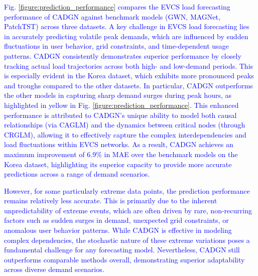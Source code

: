 \documentclass[lettersize,journal]{IEEEtran}
\newcommand{\hl}[1]{\textcolor{blue}{#1}}
\begin{document}
\hl{Fig. \ref{figure:prediction_performance} compares the EVCS load forecasting performance of CADGN against benchmark models (GWN, MAGNet, PatchTST) across three datasets. A key challenge in EVCS load forecasting lies in accurately predicting volatile peak demands, which are influenced by sudden fluctuations in user behavior, grid constraints, and time-dependent usage patterns. CADGN consistently demonstrates superior performance by closely tracking actual load trajectories across both high- and low-demand periods. This is especially evident in the Korea dataset, which exhibits more pronounced peaks and troughs compared to the other datasets. In particular, CADGN outperforms the other models in capturing sharp demand surges during peak hours, as highlighted in yellow in Fig. \ref{figure:prediction_performance}.
This enhanced performance is attributed to CADGN’s unique ability to model both causal relationships (via CAGLM) and the dynamics between critical nodes (through CRGLM), allowing it to effectively capture the complex interdependencies and load fluctuations within EVCS networks. As a result, CADGN achieves an maximum improvement of 6.9\% in MAE over the benchmark models on the Korea dataset, highlighting its superior capacity to provide more accurate predictions across a range of demand scenarios.}

\hl{However, for some particularly extreme data points, the prediction performance remains relatively less accurate. This is primarily due to the inherent unpredictability of extreme events, which are often driven by rare, non-recurring factors such as sudden surges in demand, unexpected grid constraints, or anomalous user behavior patterns. While CADGN is effective in modeling complex dependencies, the stochastic nature of these extreme variations poses a fundamental challenge for any forecasting model. Nevertheless, CADGN still outperforms comparable methods overall, demonstrating superior adaptability across diverse demand scenarios.}


\end{document}
